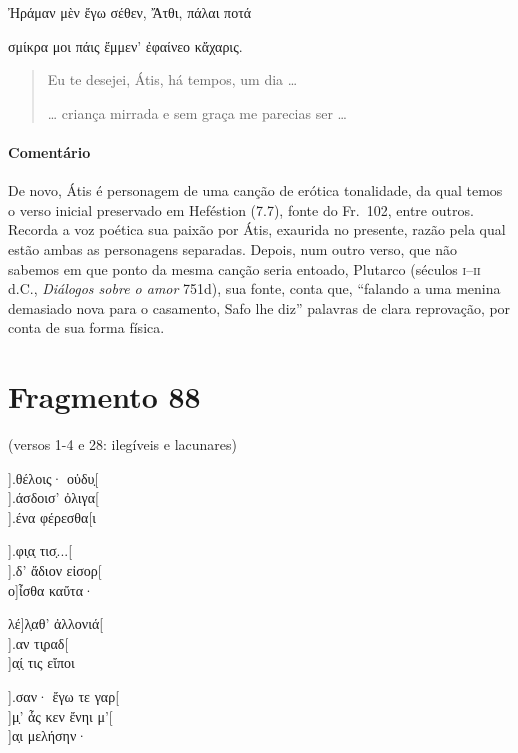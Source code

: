 {\begin{gkverse}
Ἠράμαν μὲν ἔγω σέθεν, Ἄτθι, πάλαι ποτά

\ast\quad\ast\quad\ast

σμίκρα μοι πάις ἔμμεν’ ἐφαίνεο κἄχαρις.
\end{gkverse}

\begin{verse}
Eu te desejei, Átis, há tempos, um dia \ldots{}

\ast\quad\ast\quad\ast

\ldots{} criança mirrada e sem graça me parecias ser \ldots{}
\end{verse}

{\paragraph{Comentário} De novo, Átis é personagem de uma canção de erótica tonalidade, da qual temos o verso inicial preservado em Heféstion (7.7), fonte do Fr.~102, entre outros. Recorda a voz poética sua paixão por Átis, exaurida no presente, razão pela qual estão ambas as personagens separadas. Depois, num outro verso, que não sabemos em que ponto da mesma canção seria entoado, Plutarco (séculos \textsc{i}--\textsc{ii} d.C., \textit{Diálogos sobre o amor} 751d),
sua fonte, conta que, “falando a uma menina demasiado nova para o
casamento, Safo lhe diz” palavras de clara reprovação, por conta de sua forma
física. }



\pagebreak
\section{Fragmento 88}

\begin{gkverse}
\textnormal{(versos 1-4 e 28: ilegíveis e lacunares)}

].θέλοις· οὐδυ̣[\\
].άσδοισ’ ὀλιγα[\\
].ένα φέρεσθα[ι

  ].φι̣α̣ τισ̣...[\\
  ].δ’ ἄδιον εἰσορ[\\
ο]ἶσθα καὔτα·

λέ]λ̣αθ’ ἀλλονιά[\\
     ].αν τι̣ραδ[\\
     ]α̣ί̣ τις εἴποι

].σαν· ἔγω τε γαρ[\\
]μ̣’ ἆς κεν ἔνηι μ’[\\
  ]α̣ι μελήσην·


\end{gkverse}}
